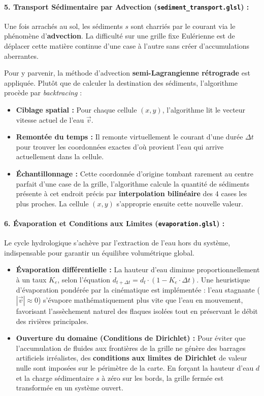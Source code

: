 \documentclass[10pt,twocolumn,a4paper]{article}
\begin{document}
\paragraph{5. Transport Sédimentaire par Advection (\texttt{sediment\_transport.glsl}) :}
Une fois arrachés au sol, les sédiments $s$ sont charriés par le courant via le phénomène d'\textbf{advection}. La difficulté sur une grille fixe Eulérienne est de déplacer cette matière continue d'une case à l'autre sans créer d'accumulations aberrantes.

Pour y parvenir, la méthode d'advection \textbf{semi-Lagrangienne rétrograde} \cite{MDH07} est appliquée. Plutôt que de calculer la destination des sédiments, l'algorithme procède par \textit{backtracing} :
\begin{itemize}
    \item \textbf{Ciblage spatial :} Pour chaque cellule $(x,y)$, l'algorithme lit le vecteur vitesse actuel de l'eau $\vec{v}$.
    \item \textbf{Remontée du temps :} Il remonte virtuellement le courant d'une durée $\Delta t$ pour trouver les coordonnées exactes d'où provient l'eau qui arrive actuellement dans la cellule.
    \item \textbf{Échantillonnage :} Cette coordonnée d'origine tombant rarement au centre parfait d'une case de la grille, l'algorithme calcule la quantité de sédiments présente à cet endroit précis par \textbf{interpolation bilinéaire} des 4 cases les plus proches. La cellule $(x,y)$ s'approprie ensuite cette nouvelle valeur.
\end{itemize}

\paragraph{6. Évaporation et Conditions aux Limites (\texttt{evaporation.glsl}) :}
Le cycle hydrologique s'achève par l'extraction de l'eau hors du système, indispensable pour garantir un équilibre volumétrique global.
\begin{itemize}
    \item \textbf{Évaporation différentielle :} La hauteur d'eau diminue proportionnellement à un taux $K_e$, selon l'équation $d_{t+\Delta t} = d_t \cdot (1 - K_e \cdot \Delta t)$. Une heuristique d'évaporation pondérée par la cinématique est implémentée : l'eau stagnante ($|\vec{v}| \approx 0$) s'évapore mathématiquement plus vite que l'eau en mouvement, favorisant l'assèchement naturel des flaques isolées tout en préservant le débit des rivières principales.
    \item \textbf{Ouverture du domaine (Conditions de Dirichlet) :} Pour éviter que l'accumulation de fluides aux frontières de la grille ne génère des barrages artificiels irréalistes, des \textbf{conditions aux limites de Dirichlet} de valeur nulle sont imposées sur le périmètre de la carte. En forçant la hauteur d'eau $d$ et la charge sédimentaire $s$ à zéro sur les bords, la grille fermée est transformée en un système ouvert.
\end{itemize}
\end{document}
